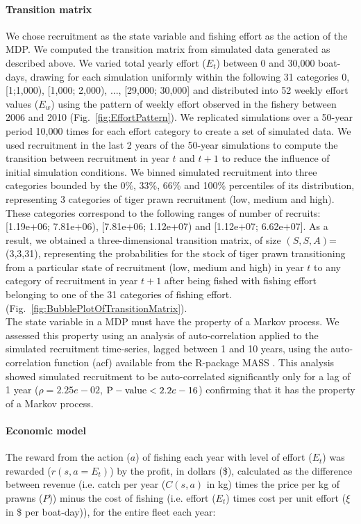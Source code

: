 \paragraph{Transition matrix} We chose recruitment as the state variable and fishing effort as the action of the MDP. We computed the transition matrix from simulated data generated as described above. We varied total yearly effort ($E_{t}$) between 0 and 30,000 boat-days, drawing for each simulation uniformly within the following 31 categories 0, [1;1,000), [1,000; 2,000), ..., [29,000; 30,000] and distributed into 52 weekly effort values ($E_{w}$) using the pattern of weekly effort observed in the fishery between 2006 and 2010 (Fig.~\ref{fig:EffortPattern}). We replicated simulations over a 50-year period 10,000 times for each effort category to create a set of simulated data. We used recruitment in the last 2 years of the 50-year simulations to compute the transition between recruitment in year $t$ and $t+1$ to reduce the influence of initial simulation conditions. We binned simulated recruitment into three categories bounded by the 0\%, 33\%, 66\% and 100\% percentiles of its distribution, representing 3 categories of tiger prawn recruitment (low, medium and high). These categories correspond to the following ranges of number of recruits: [1.19e+06; 7.81e+06), [7.81e+06; 1.12e+07) and [1.12e+07; 6.62e+07]. As a result, we obtained a three-dimensional transition matrix, of size $(S,S,A)$= (3,3,31), representing the probabilities for the stock of tiger prawn transitioning from a particular state of recruitment (low, medium and high) in year $t$ to any category of recruitment in year $t+1$ after being fished with fishing effort belonging to one of the 31 categories of fishing effort. (Fig.~\ref{fig:BubblePlotOfTransitionMatrix}).\\

The state variable in a MDP must have the property of a Markov process. We assessed this property using an analysis of auto-correlation applied to the simulated recruitment time-series, lagged between 1 and 10 years, using the auto-correlation function (acf) available from the R-package MASS \citep{MASS}. This analysis showed simulated recruitment to be auto-correlated significantly only for a lag of 1 year ($\rho=2.25e-02$, ${\rm P-value} < 2.2e-16$) confirming that it has the property of a Markov process.

\paragraph{Economic model} The reward from the action ($a$) of fishing each year with level of effort ($E_{t}$) was rewarded ($r(s,a=E_{t})$) by the profit, in dollars (\$), calculated as the difference between revenue (i.e. catch per year ($C(s,a)$ in kg) times the price per kg of prawns ($P$)) minus the cost of fishing (i.e. effort ($E_{t}$) times cost per unit effort ($\xi$ in \$ per boat-day)), for the entire fleet each year:

